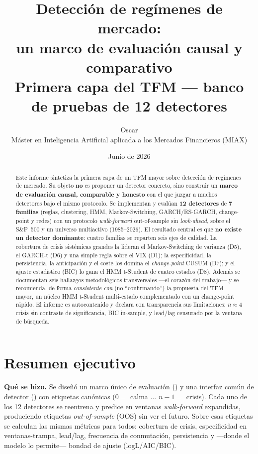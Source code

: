 \documentclass[11pt,a4paper]{article}
\title{\textbf{Detecci\'on de reg\'imenes de mercado:\\ un marco de evaluaci\'on causal y comparativo}\\[2mm]
\large Primera capa del TFM --- banco de pruebas de 12 detectores}
\author{Oscar \\ \small M\'aster en Inteligencia Artificial aplicada a los Mercados Financieros (MIAX)}
\date{Junio de 2026}
\newcommand{\code}[1]{\texttt{\detokenize{#1}}}
\begin{document}
\maketitle

\begin{abstract}
\noindent Este informe sintetiza la primera capa de un TFM mayor sobre detecci\'on de
reg\'imenes de mercado. Su objeto \textbf{no} es proponer un detector concreto, sino
construir un \textbf{marco de evaluaci\'on causal, comparable y honesto} con el que juzgar
a muchos detectores bajo el mismo protocolo. Se implementan y eval\'uan \textbf{12
detectores} de \textbf{7 familias} (reglas, clustering, HMM, Markov-Switching,
GARCH/RS-GARCH, change-point y redes) con un protocolo \emph{walk-forward}
out-of-sample sin \emph{look-ahead}, sobre el S\&P~500 y un universo multiactivo
(1985--2026). El resultado central es que \textbf{no existe un detector dominante}: cuatro
familias se reparten seis ejes de calidad. La cobertura de crisis sist\'emicas grandes la
lideran el Markov-Switching de varianza (D5), el GARCH-t (D6) y una simple regla sobre el
VIX (D1); la especificidad, la persistencia, la anticipaci\'on y el coste los domina el
\emph{change-point} CUSUM (D7); y el ajuste estad\'istico (BIC) lo gana el HMM t-Student de
cuatro estados (D8). Adem\'as se documentan seis hallazgos metodol\'ogicos transversales
---el coraz\'on del trabajo--- y se recomienda, de forma \emph{consistente con} (no
``confirmando'') la propuesta del TFM mayor, un n\'ucleo HMM t-Student multi-estado
complementado con un change-point r\'apido. El informe es autocontenido y declara con
transparencia sus limitaciones: $n\approx4$ crisis sin contraste de significancia, BIC
in-sample, y lead/lag censurado por la ventana de b\'usqueda.
\end{abstract}

\section{Resumen ejecutivo}

\textbf{Qu\'e se hizo.} Se dise\~n\'o un marco \'unico de evaluaci\'on
(\code{src/evaluation.py}) y una interfaz com\'un de detector
(\code{src/detector_base.py}) con etiquetas can\'onicas ($0=$ calma $\dots$ $n{-}1=$
crisis). Cada uno de los 12 detectores se reentrena y predice en ventanas
\emph{walk-forward} expandidas, produciendo etiquetas \emph{out-of-sample} (OOS) sin ver el
futuro. Sobre esas etiquetas se calculan las mismas m\'etricas para todos: cobertura de
crisis, especificidad en ventanas-trampa, lead/lag, frecuencia de conmutaci\'on,
persistencia y ---donde el modelo lo permite--- bondad de ajuste (logL/AIC/BIC).
\end{document}
